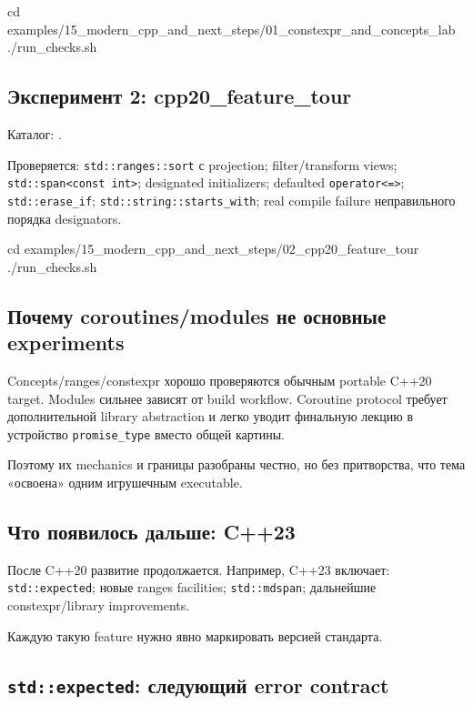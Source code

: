 \begin{shellcode}
cd examples/15_modern_cpp_and_next_steps/01_constexpr_and_concepts_lab
./run_checks.sh
\end{shellcode}

\subsection{Эксперимент 2: cpp20\_feature\_tour}

Каталог:
.

Проверяется:
\texttt{std::ranges::sort} с projection; filter/transform views; \texttt{std::span<const int>}; designated initializers; defaulted \texttt{operator<=>}; \texttt{std::erase\_if}; \texttt{std::string::starts\_with}; real compile failure неправильного порядка designators.

\begin{shellcode}
cd examples/15_modern_cpp_and_next_steps/02_cpp20_feature_tour
./run_checks.sh
\end{shellcode}

\subsection{Почему coroutines/modules не основные experiments}

Concepts/ranges/constexpr хорошо проверяются обычным portable C++20 target.
Modules сильнее зависят от build workflow. Coroutine protocol требует
дополнительной library abstraction и легко уводит финальную лекцию в устройство
\texttt{promise\_type} вместо общей картины.

Поэтому их mechanics и границы разобраны честно, но без притворства, что тема
«освоена» одним игрушечным executable.

\subsection{Что появилось дальше: C++23}

После C++20 развитие продолжается. Например, C++23 включает:
\texttt{std::expected}; новые ranges facilities; \texttt{std::mdspan}; дальнейшие constexpr/library improvements.

Каждую такую feature нужно явно маркировать версией стандарта.

\subsection{\texttt{std::expected}: следующий error contract}

